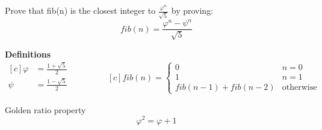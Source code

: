 \documentclass[14pt]{extarticle}
\newenvironment{problem}[2][Problem]{\begin{trivlist}
\item[\hskip \labelsep {\bfseries #1}\hskip \labelsep {\bfseries #2.}]}{\end{trivlist}}
\begin{document}
\begin{problem}{1.13}
Prove that fib(n) is the closest integer to $\frac{\varphi^n}{\sqrt{5}}$ by proving:
 $$ fib(n) = \frac{\varphi^n - \psi^n}{\sqrt{5}} $$
 \end{problem}

\textbf{Definitions}
\begin{equation*}
  \begin{aligned}[c]
    \varphi &= \frac{1 + \sqrt{5}}{2}\\
    \psi &= \frac{1 - \sqrt{5}}{2}\\
  \end{aligned}
   \qquad\qquad
 \begin{aligned}[c]
    fib(n) = \begin{cases}
               0                   & n = 0\\
               1                   & n = 1\\
               fib(n-1) + fib(n-2) & \text{otherwise}
             \end{cases}
  \end{aligned}
\end{equation*}

\vspace{5mm}
Golden ratio property
$$\varphi^2 = \varphi + 1$$
\vspace{5mm}
\end{document}
